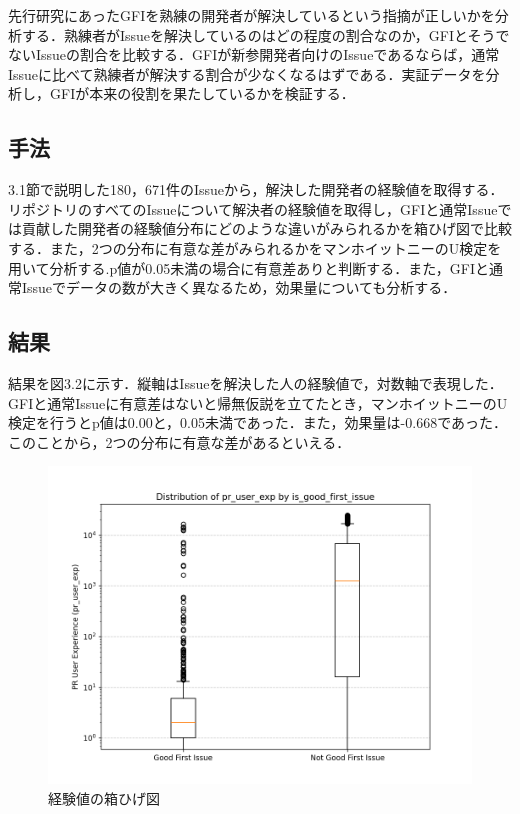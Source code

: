 \documentclass[11pt]{jreport}
\newcommand{\NIssue}{180，671}
\begin{document}
先行研究\cite{GFI}にあったGFIを熟練の開発者が解決しているという指摘が正しいかを分析する．熟練者がIssueを解決しているのはどの程度の割合なのか，GFIとそうでないIssueの割合を比較する．GFIが新参開発者向けのIssueであるならば，通常Issueに比べて熟練者が解決する割合が少なくなるはずである．実証データを分析し，GFIが本来の役割を果たしているかを検証する．

\subsection{手法}
3.1節で説明した\NIssue 件のIssueから，解決した開発者の経験値を取得する．
リポジトリのすべてのIssueについて解決者の経験値を取得し，GFIと通常Issueでは貢献した開発者の経験値分布にどのような違いがみられるかを箱ひげ図で比較する．また，2つの分布に有意な差がみられるかをマンホイットニーのU検定を用いて分析する.p値が0.05未満の場合に有意差ありと判断する．また，GFIと通常Issueでデータの数が大きく異なるため，効果量についても分析する．

\subsection{結果}

結果を図3.2に示す．縦軸はIssueを解決した人の経験値で，対数軸で表現した．GFIと通常Issueに有意差はないと帰無仮説を立てたとき，マンホイットニーのU検定を行うとp値は0.00と，0.05未満であった．また，効果量は-0.668であった．このことから，2つの分布に有意な差があるといえる．

\begin{figure}[H]
\centerline{\includegraphics[width=0.9\linewidth]{@BSthesis2024_Nakai/BSthesis2024_Nakai_fig/2025-02-03_11h12_00.png}}
\caption{経験値の箱ひげ図}
\label{fig:milestone}
\end{figure}
\end{document}
